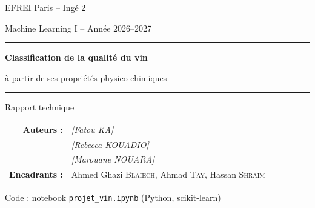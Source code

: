 \documentclass[11pt,a4paper]{article}
\newcommand{\code}[1]{\texttt{#1}}
\begin{document}
\begin{titlepage}
  \centering
  {\large EFREI Paris -- Ingé 2\par}
  {\large Machine Learning I \quad -- \quad Année 2026--2027\par}
  \vspace{3.2cm}
  {\color{vin}\rule{\linewidth}{1pt}\par}
  \vspace{0.6cm}
  {\Huge\bfseries Classification de la qualité du vin\par}
  \vspace{0.4cm}
  {\Large à partir de ses propriétés physico-chimiques\par}
  \vspace{0.6cm}
  {\color{vin}\rule{\linewidth}{1pt}\par}
  \vspace{1cm}
  {\Large Rapport technique\par}
  \vfill
  \begin{tabular}{rl}
    \textbf{Auteurs :} & \textit{[Fatou KA]} \\
                       & \textit{[Rebecca KOUADIO]} \\
                       & \textit{[Marouane NOUARA]} \\[6pt]
    \textbf{Encadrants :} & Ahmed Ghazi \textsc{Blaiech}, Ahmad \textsc{Tay}, Hassan \textsc{Shraim} \\
  \end{tabular}
  \vspace{1.5cm}

  {\small Code : notebook \code{projet\_vin.ipynb} (Python, scikit-learn)\par}
\end{titlepage}
\end{document}
